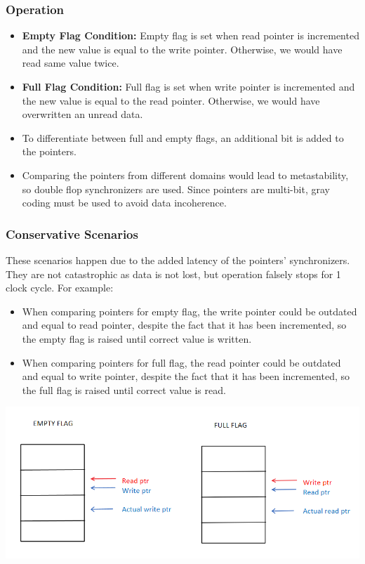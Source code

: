 \documentclass[11pt]{article}
\begin{document}
\subsubsection*{Operation}
\begin{itemize}
    \item \textbf{Empty Flag Condition:} Empty flag is set when read pointer is incremented and the new value is equal to the write pointer. Otherwise, we would have read same value twice.
    \item \textbf{Full Flag Condition:} Full flag is set when write pointer is incremented and the new value is equal to the read pointer. Otherwise, we would have overwritten an unread data.
    \item To differentiate between full and empty flags, an additional bit is added to the pointers.
    \item Comparing the pointers from different domains would lead to metastability, so double flop synchronizers are used. Since pointers are multi-bit, gray coding must be used to avoid data incoherence.
\end{itemize}

\subsubsection*{Conservative Scenarios}
These scenarios happen due to the added latency of the pointers' synchronizers. They are not catastrophic as data is not lost, but operation falsely stops for 1 clock cycle. For example:
\begin{itemize}
    \item When comparing pointers for empty flag, the write pointer could be outdated and equal to read pointer, despite the fact that it has been incremented, so the empty flag is raised until correct value is written.
    \item When comparing pointers for full flag, the read pointer could be outdated and equal to write pointer, despite the fact that it has been incremented, so the full flag is raised until correct value is read.
\end{itemize}
\begin{center}
    \includegraphics[scale=0.8]{7.png}
\end{center}
\end{document}
